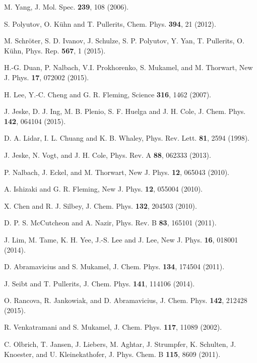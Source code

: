 \documentclass[%
 reprint,%
 amssymb, amsmath,%
 aip,cha,%
]{revtex4-1}
\begin{document}
\begin{thebibliography}{99}
 M. Yang, J. Mol. Spec. {\bf 239}, 108 (2006).

 S. Polyutov, O. K{\"u}hn and T. Pullerits, Chem. Phys. {\bf 394}, 21 (2012).

 M. Schr{\"o}ter, S. D. Ivanov, J. Schulze, S. P. Polyutov, Y. Yan, T. Pullerits, O. K{\"u}hn, Phys. Rep. {\bf 567}, 1 (2015).

 H.-G. Duan, P. Nalbach, V.I. Prokhorenko, S. Mukamel, and M. Thorwart, New J. Phys. {\bf 17}, 072002 (2015).

 H. Lee, Y.-C. Cheng and G. R. Fleming, Science {\bf 316}, 1462 (2007).

 J. Jeske, D. J. Ing, M. B. Plenio, S. F. Huelga and J. H. Cole, J. Chem. Phys. {\bf 142}, 064104 (2015).

 D. A. Lidar, I. L. Chuang and K. B. Whaley, Phys. Rev. Lett. {\bf 81}, 2594 (1998).

 J. Jeske, N. Vogt, and J. H. Cole, Phys. Rev. A {\bf 88}, 062333 (2013).

 P. Nalbach, J. Eckel, and M. Thorwart, New J. Phys. {\bf 12}, 065043 (2010).

 A. Ishizaki and G. R. Fleming, New J. Phys. {\bf 12}, 055004 (2010).

 X. Chen and R. J. Silbey, J. Chem. Phys. {\bf 132}, 204503 (2010).

 D. P. S. McCutcheon and A. Nazir, Phys. Rev. B {\bf 83}, 165101 (2011).

 J. Lim, M. Tame, K. H. Yee, J.-S. Lee and J. Lee, New J. Phys. {\bf 16}, 018001 (2014).

 D. Abramavicius and S. Mukamel, J. Chem. Phys. {\bf 134}, 174504 (2011).

 J. Seibt and T. Pullerits, J. Chem. Phys. {\bf 141}, 114106 (2014).

 O. Rancova, R. Jankowiak, and D. Abramavicius, J. Chem. Phys. {\bf 142}, 212428 (2015).

 R. Venkatramani and S. Mukamel, J. Chem. Phys. {\bf 117}, 11089 (2002).

 C. Olbrich, T. Jansen, J. Liebers, M. Aghtar, J. Strumpfer, K. Schulten, J. Knoester, and U. Kleinekathofer, J. Phys. Chem. B {\bf 115}, 8609 (2011).


\end{thebibliography}
\end{document}
